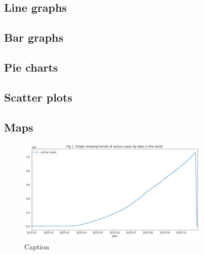 \documentclass[12pt,letterpaper, twoside]{article}
\begin{document}
\subsection{Line graphs}
\subsection{Bar graphs}
\subsection{Pie charts}
\subsection{Scatter plots}
\subsection{Maps}


\begin{figure}[h]
\includegraphics[width=0.9\linewidth, height=5cm]{linegraph.png}
\caption{Caption}
\label{fig:figure2}
\end{figure}
\end{document}

